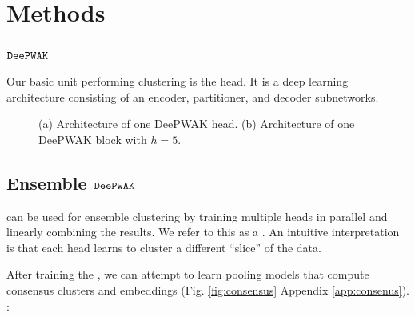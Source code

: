 \section{Methods}

\subsection{$\mathop{\mathtt{DeePWAK}}\limits$}

Our basic unit performing clustering is the \DeePWAK head.
It is a deep learning architecture consisting of an encoder, partitioner, and decoder subnetworks.


\begin{figure}
     \begin{subfigure}[b]{0.5\textwidth}
        
         \caption{}
         \label{fig:}
     \end{subfigure}
     \hfill
     \begin{subfigure}[b]{\textwidth}
        
         \caption{}
         \label{fig:}
     \end{subfigure}

     \caption{
       (a) Architecture of one DeePWAK head.
       (b) Architecture of one DeePWAK block with $h=5$.}
     \label{fig:}
\end{figure}
  
\subsection{Ensemble $\mathop{\mathtt{DeePWAK}}\limits$}

\DeePWAK can be used for ensemble clustering by training multiple heads in parallel and linearly combining the results.
We refer to this as a \DeePWAKBlock.
An intuitive interpretation is that each head learns to cluster a different ``slice'' of the data.

After training the \DeePWAKBlock, we can attempt to learn pooling models that compute consensus clusters and embeddings (Fig. \ref{fig:consensus} Appendix \ref{app:consenus}).
:

